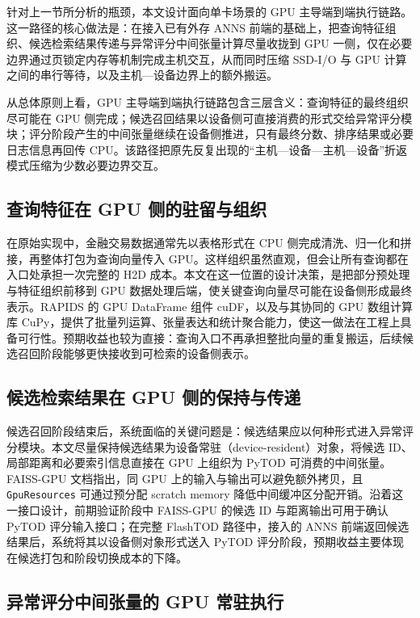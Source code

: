 针对上一节所分析的瓶颈，本文设计面向单卡场景的 GPU 主导端到端执行链路。这一路径的核心做法是：在接入已有外存 ANNS 前端的基础上，把查询特征组织、候选检索结果传递与异常评分中间张量计算尽量收拢到 GPU 一侧，仅在必要边界通过页锁定内存等机制完成主机交互，从而同时压缩 SSD-I/O 与 GPU 计算之间的串行等待，以及主机---设备边界上的额外搬运。

从总体原则上看，GPU 主导端到端执行链路包含三层含义：查询特征的最终组织尽可能在 GPU 侧完成；候选召回结果以设备侧可直接消费的形式交给异常评分模块；评分阶段产生的中间张量继续在设备侧推进，只有最终分数、排序结果或必要日志信息再回传 CPU。该路径把原先反复出现的``主机---设备---主机---设备''折返模式压缩为少数必要边界交互。

\subsection{查询特征在 GPU 侧的驻留与组织}

在原始实现中，金融交易数据通常先以表格形式在 CPU 侧完成清洗、归一化和拼接，再整体打包为查询向量传入 GPU。这样组织虽然直观，但会让所有查询都在入口处承担一次完整的 H2D 成本。本文在这一位置的设计决策，是把部分预处理与特征组织前移到 GPU 数据处理后端，使关键查询向量尽可能在设备侧形成最终表示。RAPIDS 的 GPU DataFrame 组件 cuDF，以及与其协同的 GPU 数组计算库 CuPy，提供了批量列运算、张量表达和统计聚合能力，使这一做法在工程上具备可行性\citep{rapids_cudf_pandas}。预期收益也较为直接：查询入口不再承担整批向量的重复搬运，后续候选召回阶段能够更快接收到可检索的设备侧表示。

\subsection{候选检索结果在 GPU 侧的保持与传递}

候选召回阶段结束后，系统面临的关键问题是：候选结果应以何种形式进入异常评分模块。本文尽量保持候选结果为设备常驻（device-resident）对象，将候选 ID、局部距离和必要索引信息直接在 GPU 上组织为 PyTOD 可消费的中间张量。FAISS-GPU 文档指出，同 GPU 上的输入与输出可以避免额外拷贝，且 \texttt{GpuResources} 可通过预分配 scratch memory 降低中间缓冲区分配开销\citep{faiss_gpu_wiki}。沿着这一接口设计，前期验证阶段中 FAISS-GPU 的候选 ID 与距离输出可用于确认 PyTOD 评分输入接口；在完整 FlashTOD 路径中，接入的 ANNS 前端返回候选结果后，系统将其以设备侧对象形式送入 PyTOD 评分阶段，预期收益主要体现在候选打包和阶段切换成本的下降。

\subsection{异常评分中间张量的 GPU 常驻执行}


